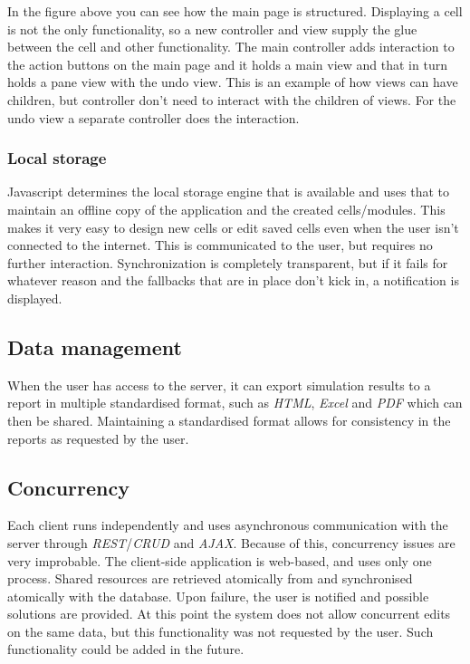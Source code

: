\documentclass{report}
\begin{document}
					In the figure above you can see how the main page is structured. Displaying a cell is not the only functionality, so a new controller and view supply the glue between the cell and other functionality. The main controller adds interaction to the action buttons on the main page and it holds a main view and that in turn holds a pane view with the undo view. This is an example of how views can have children, but controller don't need to interact with the children of views. For the undo view a separate controller does the interaction.

				\subsubsection{Local storage}
					Javascript determines the local storage engine that is available and uses that to maintain an offline copy of the application and the created cells/modules. This makes it very easy to design new cells or edit saved cells even when the user isn't connected to the internet. This is communicated to the user, but requires no further interaction. Synchronization is completely transparent, but if it fails for whatever reason and the fallbacks that are in place don't kick in, a notification is displayed.
		
		\subsection{Data management}
			When the user has access to the server, it can export simulation results to a report in multiple standardised format, such as \emph{HTML}, \emph{Excel} and \emph{PDF} which can then be shared. Maintaining a standardised format allows for consistency in the reports as requested by the user.		
	
		\subsection{Concurrency}
			Each client runs independently and uses asynchronous communication with the server through \emph{REST}/\emph{CRUD} and \emph{AJAX}. Because of this, concurrency issues are very improbable. The client-side application is web-based, and uses only one process. Shared resources are retrieved atomically from and synchronised atomically with the database. Upon failure, the user is notified and possible solutions are provided. At this point the system does not allow concurrent edits on the same data, but this functionality was not requested by the user. Such functionality could be added in the future.\\		
			
\end{document}

